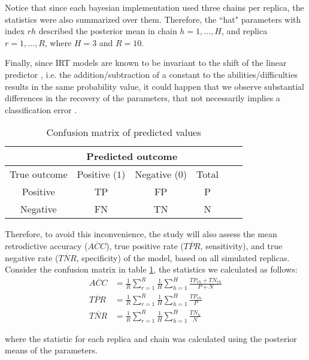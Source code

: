 Notice that since each bayesian implementation used three chains per replica, the statistics were also summarized over them. Therefore, the ``hat" parameters with index $rh$ described the posterior mean in chain $h=1, \dots, H$, and replica $r=1, \dots, R$, where $H=3$ and $R=10$.

Finally, since IRT models are known to be invariant to the shift of the linear predictor \cite{Baker_et_al_1992, Bock_1972}, i.e. the addition/subtraction of a constant to the abilities/difficulties results in the same probability value, it could happen that we observe substantial differences in the recovery of the parameters, that not necessarily implies a classification error  \cite{Wollack_2002}. 
%
\begin{table}[!h]
	\centering
	\begin{tabular}{ c|c|c|cc|c| } 
		& \multicolumn{2}{c}{Predicted outcome} \\
		\hline
		\hline
		True outcome 	& Positive ($1$) 	& Negative ($0$) 	& Total \\
		\hline
		\hline
		Positive 		& TP 				& FP 				& P \\ 
		Negative 		& FN 				& TN 				& N \\ 
	\end{tabular}
	\caption{Confusion matrix of predicted values}
	\label{tab:confusion_matrix}
\end{table}

Therefore, to avoid this inconvenience, the study will also assess the mean retrodictive accuracy ($\overline{ACC}$), true positive rate ($\overline{TPR}$, sensitivity), and true negative rate ($\overline{TNR}$, specificity) of the model, based on all simulated replicas. Consider the confusion matrix in table \ref{tab:confusion_matrix}, the statistics we calculated as follows:
%
\begin{align}
	\overline{ACC} &= \frac{1}{R} \sum_{r=1}^{R} \frac{1}{H} \sum_{h=1}^{H} \frac{TP_{rh} + TN_{rh}}{ P + N} \\
	\overline{TPR} &= \frac{1}{R} \sum_{r=1}^{R} \frac{1}{H} \sum_{h=1}^{H} \frac{TP_{rh}}{P} \\
	\overline{TNR} &= \frac{1}{R} \sum_{r=1}^{R} \frac{1}{H} \sum_{h=1}^{H} \frac{TN_{h}}{N}
\end{align}

\noindent where the statistic for each replica and chain was calculated using the posterior means of the parameters.


